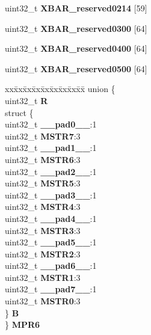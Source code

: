\begin{DoxyCompactItemize}
\begin{tabbing}
\end{tabbing}\item 
\mbox{\label{structXBAR__tag_ab9f5d7090404643afc44d2c349647912}} 
uint32\+\_\+t {\bfseries X\+B\+A\+R\+\_\+reserved0214} \mbox{[}59\mbox{]}
\item 
\mbox{\label{structXBAR__tag_a9933559b0e0d6939909e75771ce796dd}} 
uint32\+\_\+t {\bfseries X\+B\+A\+R\+\_\+reserved0300} \mbox{[}64\mbox{]}
\item 
\mbox{\label{structXBAR__tag_a7d158b6dc296968a200fd4aae9e4482e}} 
uint32\+\_\+t {\bfseries X\+B\+A\+R\+\_\+reserved0400} \mbox{[}64\mbox{]}
\item 
\mbox{\label{structXBAR__tag_a151b33012eb16c13237d710ff177830a}} 
uint32\+\_\+t {\bfseries X\+B\+A\+R\+\_\+reserved0500} \mbox{[}64\mbox{]}
\item 
\mbox{\label{structXBAR__tag_ac0d36544ea935c18033d3303cdfab473}} 
\begin{tabbing}
xx\=xx\=xx\=xx\=xx\=xx\=xx\=xx\=xx\=\kill
union \{\\
\>uint32\_t {\bfseries R}\\
\>struct \{\\
\>\>uint32\_t {\bfseries \_\_pad0\_\_}:1\\
\>\>uint32\_t {\bfseries MSTR7}:3\\
\>\>uint32\_t {\bfseries \_\_pad1\_\_}:1\\
\>\>uint32\_t {\bfseries MSTR6}:3\\
\>\>uint32\_t {\bfseries \_\_pad2\_\_}:1\\
\>\>uint32\_t {\bfseries MSTR5}:3\\
\>\>uint32\_t {\bfseries \_\_pad3\_\_}:1\\
\>\>uint32\_t {\bfseries MSTR4}:3\\
\>\>uint32\_t {\bfseries \_\_pad4\_\_}:1\\
\>\>uint32\_t {\bfseries MSTR3}:3\\
\>\>uint32\_t {\bfseries \_\_pad5\_\_}:1\\
\>\>uint32\_t {\bfseries MSTR2}:3\\
\>\>uint32\_t {\bfseries \_\_pad6\_\_}:1\\
\>\>uint32\_t {\bfseries MSTR1}:3\\
\>\>uint32\_t {\bfseries \_\_pad7\_\_}:1\\
\>\>uint32\_t {\bfseries MSTR0}:3\\
\>\} {\bfseries B}\\
\} {\bfseries MPR6}\\


\end{tabbing}
\end{DoxyCompactItemize}
